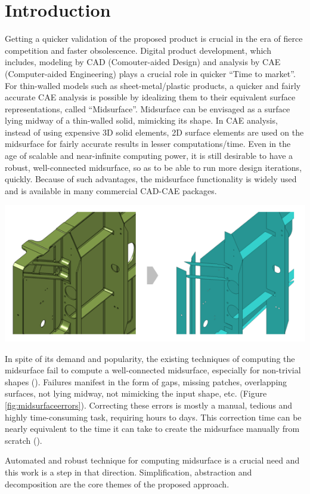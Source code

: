 \section{Introduction}\label{sec:intro}

Getting a quicker validation of the proposed product is crucial in the era of fierce competition and faster obsolescence. Digital product development, which includes, modeling by CAD (Comouter-aided Design)  and analysis by CAE (Computer-aided Engineering) plays a crucial role in quicker ``Time to market''.  For thin-walled models such as sheet-metal/plastic products, a quicker and fairly accurate CAE analysis is possible by idealizing them to their equivalent surface representations, called ``Midsurface''. Midsurface can be envisaged as a surface lying midway of a thin-walled solid, mimicking its shape.   In CAE analysis, instead of using expensive 3D solid elements, 2D surface elements are used on the midsurface for fairly accurate results in lesser computations/time.  Even in the age of scalable and near-infinite computing power, it is still desirable to have  a robust, well-connected midsurface, so as to be able to run more design iterations, quickly.  Because of such advantages, the midsurface functionality is widely used and is available in many commercial CAD-CAE packages. 

\begin{minipage}[h]{\linewidth} 
\begin{minipage}[h]{0.34\linewidth} 
		\centering
		\includegraphics[width=\linewidth]{..//Common/images/MidsurfaceErrorsMscApex}
		\label{fig:midsurfaceerrors}
\end{minipage}
\hfill
\begin{minipage}[h]{0.64\linewidth} 
In spite of its demand and popularity, the existing techniques of computing the midsurface fail to compute a well-connected midsurface, especially for non-trivial shapes (\cite{Woo2013,Automex}). Failures manifest in the form of gaps, missing patches, overlapping surfaces, not lying midway, not mimicking the input shape, etc. (Figure \ref{fig:midsurfaceerrors}). Correcting these errors is mostly a manual, tedious and highly time-consuming task, requiring hours to days. This correction time can be nearly equivalent to the time it can take to create the midsurface manually from scratch (\cite{Stolt2006}). 
\end{minipage}
\end{minipage}



 Automated and  robust technique for computing midsurface  is a crucial need and this work is a step in that direction. Simplification, abstraction and decomposition are the core themes of the proposed approach.

